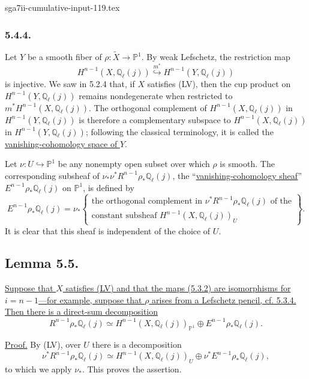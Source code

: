 \begin{filecontents*}{sga7ii-cumulative-input-119.tex}
\subsubsection*{5.4.4.}
Let $Y$ be a smooth fiber of
$\rho:\widetilde X\to\mathbb P^1$.  By weak Lefschetz, the restriction map
\[
H^{n-1}(X,\mathbb Q_\ell(j))
\overset{m^*}{\hookrightarrow}
H^{n-1}(Y,\mathbb Q_\ell(j))
\]
is injective.  We saw in 5.2.4 that, if $X$ satisfies (LV), then the cup
product on $H^{n-1}(Y,\mathbb Q_\ell(j))$ remains nondegenerate when
restricted to $m^*H^{n-1}(X,\mathbb Q_\ell(j))$.  The orthogonal complement
of $H^{n-1}(X,\mathbb Q_\ell(j))$ in
$H^{n-1}(Y,\mathbb Q_\ell(j))$ is therefore a complementary subspace to
$H^{n-1}(X,\mathbb Q_\ell(j))$ in
$H^{n-1}(Y,\mathbb Q_\ell(j))$; following the classical terminology, it is
called the \underline{vanishing-cohomology space of $Y$}.

Let $\nu:U\hookrightarrow\mathbb P^1$ be any nonempty open subset over
which $\rho$ is smooth.  The corresponding subsheaf of
$\nu_*\nu^*R^{n-1}\rho_*\mathbb Q_\ell(j)$, the
``\underline{vanishing-cohomology sheaf}''
$E^{n-1}\rho_*\mathbb Q_\ell(j)$ on $\mathbb P^1$, is defined by
\begin{equation}\tag{5.4.4.1}
E^{n-1}\rho_*\mathbb Q_\ell(j)
=\nu_*\left\{
\begin{array}{l}
\text{the orthogonal complement in }
\nu^*R^{n-1}\rho_*\mathbb Q_\ell(j)\text{ of the}\\[1ex]
\text{constant subsheaf }H^{n-1}(X,\mathbb Q_\ell(j))_U
\end{array}
\right\}.
\end{equation}
It is clear that this sheaf is independent of the choice of $U$.

\subsection*{Lemma 5.5.}
\underline{Suppose that $X$ satisfies (LV) and that the maps (5.3.2) are
isomorphisms for $i=n-1$---for example, suppose that $\rho$ arises from a
Lefschetz pencil, cf. 5.3.4.  Then there is a direct-sum decomposition}
\begin{equation}\tag{5.5.1}
R^{n-1}\rho_*\mathbb Q_\ell(j)
\simeq
H^{n-1}(X,\mathbb Q_\ell(j))_{\mathbb P^1}
\oplus E^{n-1}\rho_*\mathbb Q_\ell(j).
\end{equation}

\underline{Proof.}
By (LV), over $U$ there is a decomposition
\begin{equation}\tag{5.5.2}
\nu^*R^{n-1}\rho_*\mathbb Q_\ell(j)
\simeq
H^{n-1}(X,\mathbb Q_\ell(j))_U
\oplus \nu^*E^{n-1}\rho_*\mathbb Q_\ell(j),
\end{equation}
to which we apply $\nu_*$.  This proves the assertion.
\end{filecontents*}
